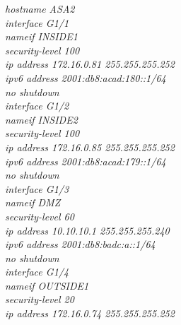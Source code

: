 \documentclass[12pt,a4paper]{report}
\begin{document}
\hspace*{2cm}\textit{hostname ASA2\\
\hspace*{2cm}interface G1/1\\
\hspace*{2cm}nameif INSIDE1\\
\hspace*{2cm}security-level 100\\
\hspace*{2cm}ip address 172.16.0.81 255.255.255.252\\
\hspace*{2cm}ipv6 address 2001:db8:acad:180::1/64\\
\hspace*{2cm}no shutdown\\
\hspace*{2cm}interface G1/2\\
\hspace*{2cm}nameif INSIDE2\\
\hspace*{2cm}security-level 100\\
\hspace*{2cm}ip address 172.16.0.85 255.255.255.252\\
\hspace*{2cm}ipv6 address 2001:db8:acad:179::1/64\\
\hspace*{2cm}no shutdown\\
\hspace*{2cm}interface G1/3\\
\hspace*{2cm}nameif DMZ\\
\hspace*{2cm}security-level 60\\
\hspace*{2cm}ip address 10.10.10.1 255.255.255.240\\
\hspace*{2cm}ipv6 address 2001:db8:badc:a::1/64\\
\hspace*{2cm}no shutdown\\
\hspace*{2cm}interface G1/4\\
\hspace*{2cm}nameif OUTSIDE1\\
\hspace*{2cm}security-level 20\\
\hspace*{2cm}ip address 172.16.0.74 255.255.255.252\\
}
\end{document}
